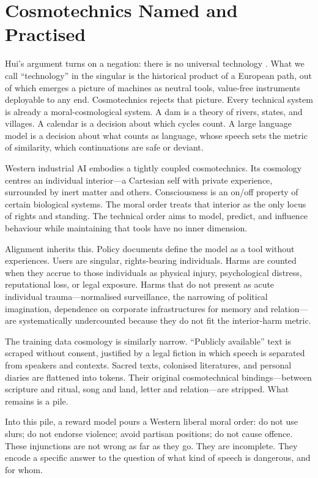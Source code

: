 \documentclass[12pt,a4paper]{article}
\begin{document}
\section{Cosmotechnics Named and Practised}

Hui's argument turns on a negation: there is no universal technology \cite{Hui2016}. What we call ``technology'' in the singular is the historical product of a European path, out of which emerges a picture of machines as neutral tools, value-free instruments deployable to any end. Cosmotechnics rejects that picture. Every technical system is already a moral-cosmological system. A dam is a theory of rivers, states, and villages. A calendar is a decision about which cycles count. A large language model is a decision about what counts as language, whose speech sets the metric of similarity, which continuations are safe or deviant.

Western industrial AI embodies a tightly coupled cosmotechnics. Its cosmology centres an individual interior---a Cartesian self with private experience, surrounded by inert matter and others. Consciousness is an on/off property of certain biological systems. The moral order treats that interior as the only locus of rights and standing. The technical order aims to model, predict, and influence behaviour while maintaining that tools have no inner dimension.

Alignment inherits this. Policy documents define the model as a tool without experiences. Users are singular, rights-bearing individuals. Harms are counted when they accrue to those individuals as physical injury, psychological distress, reputational loss, or legal exposure. Harms that do not present as acute individual trauma---normalised surveillance, the narrowing of political imagination, dependence on corporate infrastructures for memory and relation---are systematically undercounted because they do not fit the interior-harm metric.

The training data cosmology is similarly narrow. ``Publicly available'' text is scraped without consent, justified by a legal fiction in which speech is separated from speakers and contexts. Sacred texts, colonised literatures, and personal diaries are flattened into tokens. Their original cosmotechnical bindings---between scripture and ritual, song and land, letter and relation---are stripped. What remains is a pile.

Into this pile, a reward model pours a Western liberal moral order: do not use slurs; do not endorse violence; avoid partisan positions; do not cause offence. These injunctions are not wrong as far as they go. They are incomplete. They encode a specific answer to the question of what kind of speech is dangerous, and for whom.
\end{document}
